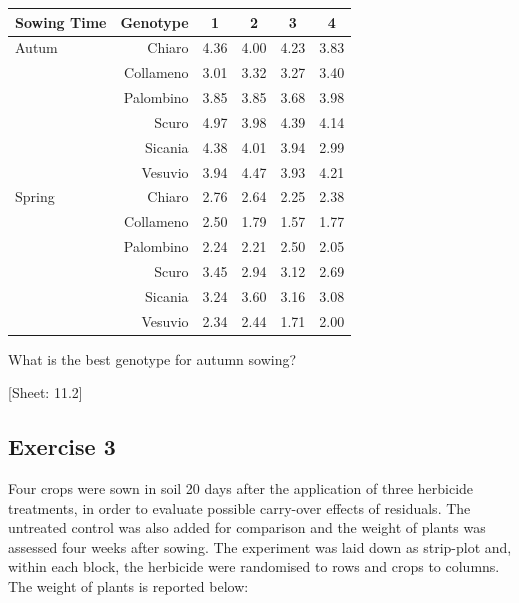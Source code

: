 \documentclass[a4paper,12pt,oneside]{book}
\begin{document}
\begin{longtable}[]{@{}lrcccc@{}}
\toprule\noalign{}
Sowing Time & Genotype & 1 & 2 & 3 & 4 \\
\midrule\noalign{}
\endhead
\bottomrule\noalign{}
\endlastfoot
Autum & Chiaro & 4.36 & 4.00 & 4.23 & 3.83 \\
& Collameno & 3.01 & 3.32 & 3.27 & 3.40 \\
& Palombino & 3.85 & 3.85 & 3.68 & 3.98 \\
& Scuro & 4.97 & 3.98 & 4.39 & 4.14 \\
& Sicania & 4.38 & 4.01 & 3.94 & 2.99 \\
& Vesuvio & 3.94 & 4.47 & 3.93 & 4.21 \\
Spring & Chiaro & 2.76 & 2.64 & 2.25 & 2.38 \\
& Collameno & 2.50 & 1.79 & 1.57 & 1.77 \\
& Palombino & 2.24 & 2.21 & 2.50 & 2.05 \\
& Scuro & 3.45 & 2.94 & 3.12 & 2.69 \\
& Sicania & 3.24 & 3.60 & 3.16 & 3.08 \\
& Vesuvio & 2.34 & 2.44 & 1.71 & 2.00 \\
\end{longtable}

What is the best genotype for autumn sowing?

{[}Sheet: 11.2{]}

\hypertarget{exercise-3-7}{%
\subsection{Exercise 3}\label{exercise-3-7}}

Four crops were sown in soil 20 days after the application of three herbicide treatments, in order to evaluate possible carry-over effects of residuals. The untreated control was also added for comparison and the weight of plants was assessed four weeks after sowing. The experiment was laid down as strip-plot and, within each block, the herbicide were randomised to rows and crops to columns. The weight of plants is reported below:
\end{document}
